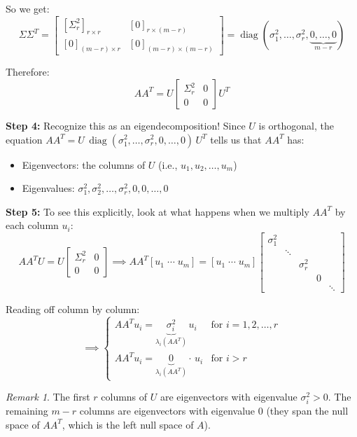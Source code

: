 \documentclass[11pt]{article}
\theoremstyle{definition}
\theoremstyle{plain}
\theoremstyle{remark}
\newtheorem{remark}[definition]{Remark}
\DeclareMathOperator{\diag}{diag}
\begin{document}
So we get:
\[
\Sigma \Sigma^T = \begin{bmatrix} [\Sigma_r^2]_{r \times r} & [0]_{r \times (m-r)} \\ [0]_{(m-r) \times r} & [0]_{(m-r) \times (m-r)} \end{bmatrix}
= \diag(\sigma_1^2, \ldots, \sigma_r^2, \underbrace{0, \ldots, 0}_{m-r})
\]

Therefore:
\[
\boxed{AA^T = U \begin{bmatrix} \Sigma_r^2 & 0 \\ 0 & 0 \end{bmatrix} U^T}
\]

\textbf{Step 4:} Recognize this as an eigendecomposition! Since $U$ is orthogonal, the equation $AA^T = U\,\diag(\sigma_1^2, \ldots, \sigma_r^2, 0, \ldots, 0)\,U^T$ tells us that $AA^T$ has:

\begin{itemize}[nosep]
\item Eigenvectors: the columns of $U$ (i.e., $u_1, u_2, \ldots, u_m$)
\item Eigenvalues: $\sigma_1^2, \sigma_2^2, \ldots, \sigma_r^2, 0, 0, \ldots, 0$
\end{itemize}

\textbf{Step 5:} To see this explicitly, look at what happens when we multiply $AA^T$ by each column $u_i$:
\[
AA^T U = U \begin{bmatrix} \Sigma_r^2 & 0 \\ 0 & 0 \end{bmatrix}
\implies AA^T [u_1 \;\cdots\; u_m] = [u_1 \;\cdots\; u_m] \begin{bmatrix} \sigma_1^2 & & & & \\ & \ddots & & & \\ & & \sigma_r^2 & & \\ & & & 0 & \\ & & & & \ddots \end{bmatrix}
\]

Reading off column by column:
\[
\implies \begin{cases}
AA^T u_i = \underbrace{\sigma_i^2}_{\lambda_i(AA^T)}\, u_i & \text{for } i = 1, 2, \ldots, r \\[6pt]
AA^T u_i = \underbrace{0}_{\lambda_i(AA^T)} \cdot\, u_i & \text{for } i > r
\end{cases}
\]

\begin{remark}
The first $r$ columns of $U$ are eigenvectors with eigenvalue $\sigma_i^2 > 0$. The remaining $m - r$ columns are eigenvectors with eigenvalue $0$ (they span the null space of $AA^T$, which is the left null space of $A$).
\end{remark}
\end{document}
